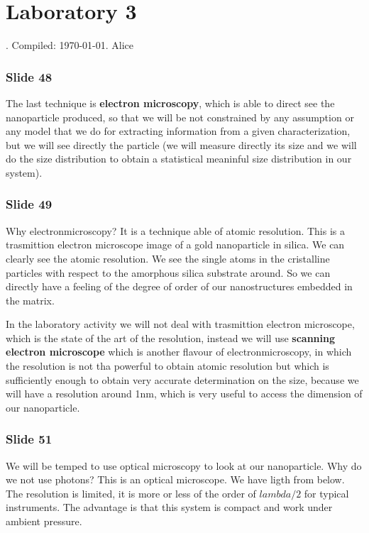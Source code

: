 \documentclass[../main/main.tex]{subfiles}
\begin{document}
\section{Laboratory 3 }

. Compiled: \today. Alice


\subsubsection{Slide 48}
The last technique is \textbf{electron microscopy}, which is able to direct see the nanoparticle produced, so that we will be not constrained by any assumption or any model that we do for extracting information from a given characterization, but we will see directly the particle (we will measure directly its size and we will do the size distribution to obtain a statistical meaninful size distribution in our system).

\subsubsection{Slide 49}
Why electronmicroscopy? It is a technique able of atomic resolution. This is a trasmittion electron microscope image of a gold nanoparticle in silica. We can clearly see the atomic resolution. We see the single atoms in the cristalline particles with respect to the amorphous silica substrate around. So we can directly have a feeling of the degree of order of our nanostructures embedded in the matrix.

In the laboratory activity we will not deal with trasmittion electron microscope, which is the state of the art of the resolution, instead we will use \textbf{scanning electron microscope} which is another flavour of electronmicroscopy, in which the resolution is not tha powerful to obtain atomic resolution but which is sufficiently enough to obtain very accurate determination on the size, because we will have a resolution around  1nm, which is very useful to access the dimension of our nanoparticle.


\subsubsection{Slide 51}
We will be temped to use optical microscopy to look at our nanoparticle. Why do we not use photons? This is an optical microscope. We have ligth from below.
The resolution is limited, it is more or less of the order of \( lambda/2 \) for typical instruments.
The advantage is that this system is compact and work under ambient pressure.
\end{document}

